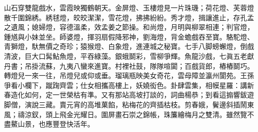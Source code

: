 \begin{myquote}
山石穿雙龍戲水，雲霞映獨鶴朝天。金屏燈、玉樓燈見一片珠璣；荷花燈、芙蓉燈散千圍錦綉。綉毬燈，皎皎潔潔，雪花燈，拂拂紛紛。秀才燈，揖讓進止，存孔孟之遺風；{}媳婦燈，容德溫柔，效孟姜之節操。和尚燈，月明與柳翠相連；判官燈，鍾馗與小妹並坐。師婆燈，揮羽扇假降邪神，劉海燈，背金蟾戲吞至寶。駱駝燈、青獅燈，馱無價之奇珍；猿猴燈、白象燈，進連城之秘寶。七手八脚螃蠏燈，倒戲清波，巨大口髯鮎魚燈，平吞綠藻。銀蛾鬬彩，雪柳爭輝。魚龍沙戲，七眞五老獻丹書；吊掛流蘇，九夷八蠻來進寶。村裡社鼓，隊隊喧闐；百戲貨郎，樁樁鬬巧。轉燈兒一來一往，吊燈兒或仰或垂。瑠璃瓶映美女奇花，雲母障並瀛州閬苑。王孫爭看小欄下，蹴踘齊雲；仕女相攜高樓上，妖嬈衒色。卦肆雲集，相幙星羅：講新春造化如何，定一世榮枯有準。又有那站高坡打談的，詞曲楊恭；到看這搧響鈸遊脚僧，演說三藏。賣元宵的高堆菓餡，粘梅花的齊插枯枝。剪春娥，鬢邊斜插鬧東風；禱涼釵，頭上飛金光耀日。圍屏畫石崇之錦帳，珠簾繪梅月之雙清。雖然覽不盡鰲山景，也應豐登快活年。
\end{myquote}

